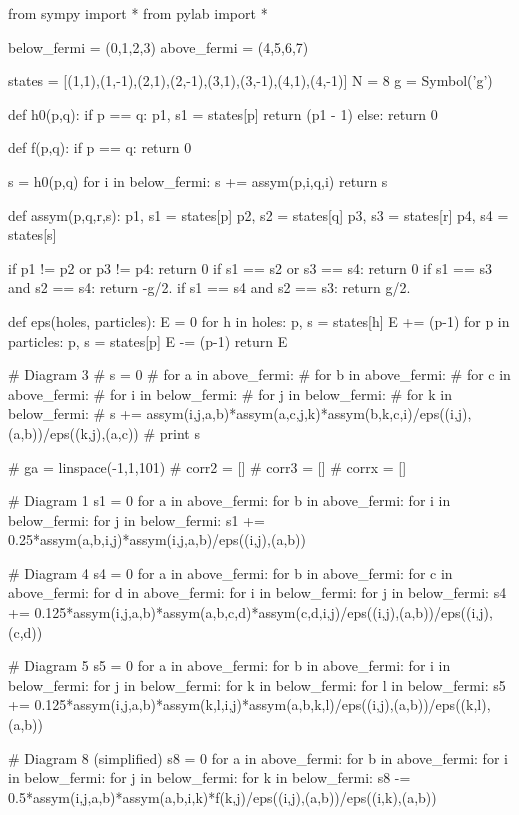 \documentclass[%
twoside,                 %
final,                   %
10pt]{article}
\newenvironment{doconceexercise}{}{}
\begin{document}
\begin{doconceexercise}
\bpypro
from sympy import *
from pylab import *

below_fermi = (0,1,2,3)
above_fermi = (4,5,6,7)

states = [(1,1),(1,-1),(2,1),(2,-1),(3,1),(3,-1),(4,1),(4,-1)]
N = 8
g = Symbol('g')



def h0(p,q):
	if p == q:
		p1, s1 = states[p]
		return (p1 - 1)	
	else:
		return 0

def f(p,q):
	if p == q:
		return 0

	s = h0(p,q)
	for i in below_fermi:
		s += assym(p,i,q,i)
	return s


def assym(p,q,r,s):
	p1, s1 = states[p]
	p2, s2 = states[q]
	p3, s3 = states[r]
	p4, s4 = states[s]

	if p1 != p2 or p3 != p4:
		return 0
	if s1 == s2 or s3 == s4:
		return 0
	if s1 == s3 and s2 == s4:
		return -g/2.
	if s1 == s4 and s2 == s3:
		return g/2.

def eps(holes, particles):
	E = 0
	for h in holes:
		p, s = states[h]
		E += (p-1)
	for p in particles:
		p, s = states[p]
		E -= (p-1)
	return E


# Diagram 3
# s = 0 
# for a in above_fermi:
# 	for b in above_fermi:
# 		for c in above_fermi:
# 			for i in below_fermi:
# 				for j in below_fermi:
# 					for k in below_fermi:
# 						s += assym(i,j,a,b)*assym(a,c,j,k)*assym(b,k,c,i)/eps((i,j),(a,b))/eps((k,j),(a,c))
# print s


# ga = linspace(-1,1,101)
# corr2 = []
# corr3 = []
# corrx = []


# Diagram 1
s1 = 0
for a in above_fermi:
	for b in above_fermi:
		for i in below_fermi:
			for j in below_fermi:
				s1 += 0.25*assym(a,b,i,j)*assym(i,j,a,b)/eps((i,j),(a,b))

# Diagram 4
s4 = 0
for a in above_fermi:
	for b in above_fermi:
		for c in above_fermi:
			for d in above_fermi:
				for i in below_fermi:
					for j in below_fermi:
						s4 += 0.125*assym(i,j,a,b)*assym(a,b,c,d)*assym(c,d,i,j)/eps((i,j),(a,b))/eps((i,j),(c,d))

# Diagram 5
s5 = 0
for a in above_fermi:
	for b in above_fermi:
		for i in below_fermi:
			for j in below_fermi:
				for k in below_fermi:
					for l in below_fermi:
						s5 += 0.125*assym(i,j,a,b)*assym(k,l,i,j)*assym(a,b,k,l)/eps((i,j),(a,b))/eps((k,l),(a,b))

# Diagram 8 (simplified)
s8 = 0 
for a in above_fermi:
	for b in above_fermi:
		for i in below_fermi:
			for j in below_fermi:
				for k in below_fermi:
					s8 -= 0.5*assym(i,j,a,b)*assym(a,b,i,k)*f(k,j)/eps((i,j),(a,b))/eps((i,k),(a,b))


\end{doconceexercise}
\end{document}
